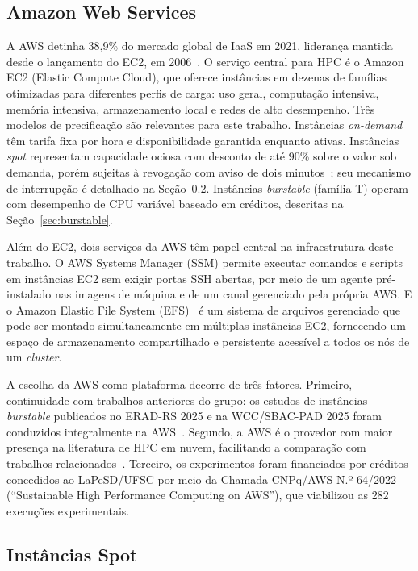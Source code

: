 \subsection{Amazon Web Services}
\label{sec:aws}

A AWS detinha 38,9\% do mercado global de IaaS em 2021, liderança mantida desde o
lançamento do EC2, em 2006~\cite{gartner2022iaas}. O serviço central para HPC é o
Amazon EC2 (Elastic Compute Cloud), que oferece instâncias em dezenas de famílias
otimizadas para diferentes perfis de carga: uso geral, computação intensiva, memória
intensiva, armazenamento local e redes de alto desempenho. Três modelos de
precificação são relevantes para este trabalho. Instâncias \textit{on-demand} têm
tarifa fixa por hora e disponibilidade garantida enquanto ativas. Instâncias
\textit{spot} representam capacidade ociosa com desconto de até 90\% sobre o valor
sob demanda, porém sujeitas à revogação com aviso de dois minutos~\cite{aws2018spot};
seu mecanismo de interrupção é detalhado na Seção~\ref{sec:spot}. Instâncias
\textit{burstable} (família T) operam com desempenho de CPU variável baseado em
créditos, descritas na Seção~\ref{sec:burstable}.

Além do EC2, dois serviços da AWS têm papel central na infraestrutura deste trabalho. O
AWS Systems Manager (SSM) permite executar comandos e scripts em instâncias EC2 sem exigir
portas SSH abertas, por meio de um agente pré-instalado nas imagens de máquina e de um canal
gerenciado pela própria AWS. E o Amazon Elastic File System (EFS)~\cite{aws2026efs} é um sistema
de arquivos gerenciado que pode ser montado simultaneamente em múltiplas instâncias EC2,
fornecendo um espaço de armazenamento compartilhado e persistente acessível a todos os nós
de um \textit{cluster}.

A escolha da AWS como plataforma decorre de três fatores. Primeiro, continuidade com
trabalhos anteriores do grupo: os estudos de instâncias \textit{burstable} publicados
no ERAD-RS 2025 e na WCC/SBAC-PAD 2025 foram conduzidos integralmente na
AWS~\cite{soda2025erad,soda2025wcc}. Segundo, a AWS é o provedor com maior presença
na literatura de HPC em nuvem, facilitando a comparação com trabalhos
relacionados~\cite{dancheva2023efa,gong2015cost,zhou2022farspot}. Terceiro, os
experimentos foram financiados por créditos concedidos ao LaPeSD/UFSC por meio da
Chamada CNPq/AWS N.º 64/2022 (``Sustainable High Performance Computing on AWS''),
que viabilizou as 282 execuções experimentais.

\subsection{Instâncias Spot}
\label{sec:spot}

